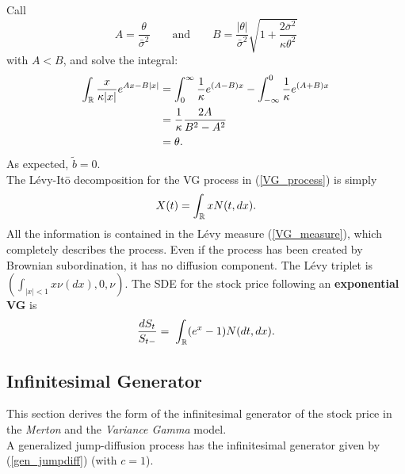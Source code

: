 Call $$A = \frac{\theta}{\bar\sigma^2} \hspace{2em} \mbox{and} \hspace{2em} 
B=\frac{|\theta|}{\bar\sigma^2}\sqrt{1+\frac{2\bar\sigma^2}{\kappa \theta^2}}$$
with $A<B$, and solve the integral:
\begin{align*}
 \int_{\mathbb{R}} \frac{x}{\kappa |x|} e^{Ax-B|x|} &= \int_{0}^{\infty} \frac{1}{\kappa} e^{(A-B)x} 
 - \int_{-\infty}^0 \frac{1}{\kappa} e^{(A+B)x} \\
 &= \frac{1}{\kappa} \frac{2A}{B^2-A^2} \\
 &= \theta.
\end{align*}
As expected, $\tilde b = 0$. \\
The Lévy-It\={o} decomposition for the VG process in (\ref{VG_process}) is simply
\begin{equation}
X(t) = \int_{\mathbb{R}} x N(t,dx). 
\end{equation}
All the information is contained in the Lévy measure (\ref{VG_measure}),
which completely describes the process. Even if the process has been created by Brownian
subordination, it has no diffusion component.  
The L\'evy triplet is $( \int_{|x|<1} x \nu(dx), 0, \nu)$.
The SDE for the stock price following an \textbf{exponential VG} is 
\begin{equation}\label{VG_sde}
 \frac{d S_t}{S_{t-}}  = \; \int_{\mathbb{R}} (e^{x} - 1) N(dt,dx).  
\end{equation}


\subsection{Infinitesimal Generator}

This section derives the form of the infinitesimal generator of the stock price in the \emph{Merton} and the \emph{Variance Gamma} model.\\
A generalized jump-diffusion process has the infinitesimal generator given by (\ref{gen_jumpdiff}) (with $c=1$). 

